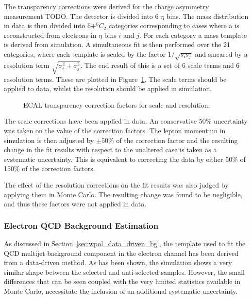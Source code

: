 The transparency corrections were derived for the \PW charge asymmetry
measurement TODO. The detector is divided into 6 $\eta$ bins. The \Zee mass
distribution in data is then divided into $6 + ^6C_2$ categories corresponding
to cases where a \PZ is reconstructed from electrons in $\eta$ bins $i$ and $j$.
For each category a mass template is derived from simulation. A simultaneous fit
is then performed over the 21 categories, where each template is scaled by the
factor $1/\sqrt{s_is_j}$ and smeared by a resolution term $\sqrt{\sigma_i^2 +
  \sigma_j^2}$. The end result of this is a set of 6 scale terms and 6
resolution terms. These are plotted in Figure~\ref{fig:wpol_ecal_transp_corr}.
The scale terms should be applied to data, whilst the resolution should be
applied in simulation.

\begin{figure}
\centering
{}\quad
{}\quad
\caption[]{\ac{ECAL} transparency correction factors for
   scale and
   resolution.}
\label{fig:wpol_ecal_transp_corr}
\end{figure}


The scale corrections have been applied in data. An conservative 50\%
uncertainty was taken on the value of the correction factors. The lepton
momentum in simulation is then adjusted by $\pm 50\%$ of the correction factor
and the resulting change in the fit results with respect to the unaltered case
is taken as a systematic uncertainty. This is equivalent to correcting the data
by either 50\% of 150\% of the correction factors.

The effect of the resolution corrections on the fit results was also judged by
applying them in Monte Carlo. The resulting change was found to be negligible,
and thus these factors were not applied in data.

\subsubsection{Electron \ac{QCD} Background Estimation}
As discussed in Section~\ref{sec:wpol_data_driven_bg}, the template used to fit
the \ac{QCD} multijet background component in the electron channel has been
derived from a data-driven method. As has been shown, the simulation shows a
very similar \LP shape between the selected and anti-selected samples. However,
the small differences that can be seen coupled with the very limited statistics
available in Monte Carlo, necessitate the inclusion of an additional systematic
uncertainty.

